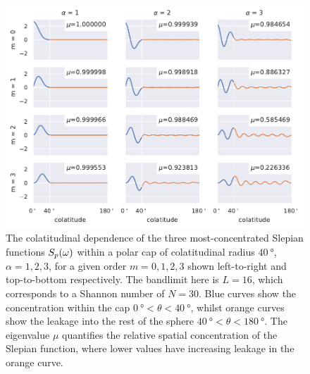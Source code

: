 \begin{figure}[htpb]
	\centering\capstart{}
	\includegraphics[width=\textwidth]{slepian_colatitude.pdf}
	\caption[
        The colatitudinal dependence of the polar cap Slepian functions
	]{
		The colatitudinal dependence of the three most-concentrated Slepian functions \({S}_{p}(\omega)\) within a polar cap of colatitudinal radius \(\SI{40}{\degree}\), \ie{} \(\alpha=1,2,3\), for a given order \(m=0,1,2,3\) shown left-to-right and top-to-bottom respectively.
		The bandlimit here is  \(L=16\), which corresponds to a Shannon number of \(N=30\).
		Blue curves show the concentration within the cap \(\SI{0}{\degree} < \theta < \SI{40}{\degree}\), whilst orange curves show the leakage into the rest of the sphere \(\SI{40}{\degree} < \theta < \SI{180}{\degree}\).
		The eigenvalue \(\mu\) quantifies the relative spatial concentration of the Slepian function, where lower values have increasing leakage in the orange curve.
	}\label{fig:chapter2_slepian_colatitude}
\end{figure}
